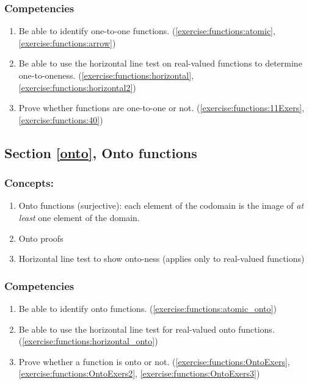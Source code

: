 \subsubsection*{Competencies}
\begin{enumerate}
\item
Be able to identify one-to-one functions.  (\ref{exercise:functions:atomic}, \ref{exercise:functions:arrow})
\item
Be able to use the horizontal line test on real-valued functions to determine one-to-oneness.  (\ref{exercise:functions:horizontal}, \ref{exercise:functions:horizontal2})
\item
Prove whether functions are one-to-one or not. (\ref{exercise:functions:11Exers}, \ref{exercise:functions:40})
\end{enumerate}


\subsection*{Section \ref{onto}, Onto functions}
\subsubsection*{Concepts:}
\begin{enumerate}
\item 
Onto functions (surjective): each element of the codomain is the image of \emph{at least} one element of the domain.
\item
Onto proofs
\item
Horizontal line test to show onto-ness (applies only to real-valued functions)
\end{enumerate}

\subsubsection*{Competencies}
\begin{enumerate}
\item
Be able to identify onto functions. (\ref{exercise:functions:atomic_onto})
\item
Be able to use the horizontal line test for real-valued onto functions. (\ref{exercise:functions:horizontal_onto})
\item
Prove whether a function is onto or not.  (\ref{exercise:functions:OntoExers}, \ref{exercise:functions:OntoExers2}, \ref{exercise:functions:OntoExers3})
\end{enumerate}



